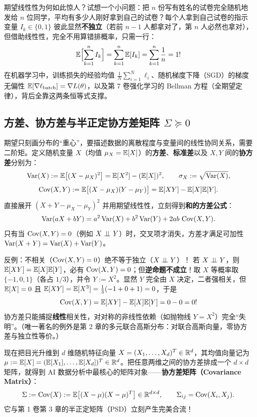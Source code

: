 期望线性性为何如此惊人？试想一个小问题：把 $n$ 份写有姓名的试卷完全随机地发给 $n$ 位同学，平均有多少人刚好拿到自己的试卷？每个人拿到自己试卷的指示变量 $I_k \in \{0, 1\}$ 彼此显然\textbf{不独立}（若前 $n-1$ 人都拿对了，第 $n$ 人必然也拿对），但借助线性性，完全不用算错排概率，只需一行：
\[
  \mathbb{E}\Bigl[\sum_{k=1}^n I_k\Bigr] = \sum_{k=1}^n \mathbb{E}[I_k] = \sum_{k=1}^n \frac{1}{n} = 1!
\]
在机器学习中，训练损失的经验均值 $\frac{1}{N}\sum_{i=1}^N \ell_i$、随机梯度下降（SGD）的梯度无偏性 $\mathbb{E}[\nabla \ell_{\text{batch}}] = \nabla L(\theta)$，以及第 7 卷强化学习的 Bellman 方程（全期望定律），背后全靠这两条恒等式支撑。

\subsection{方差、协方差与半正定协方差矩阵 $\Sigma \succeq 0$}

期望只刻画分布的“重心”，要描述数据的离散程度与变量间的线性协同关系，需要二阶矩。定义随机变量 $X$（均值 $\mu_X = \mathbb{E}[X]$）的\textbf{方差}、\textbf{标准差}以及 $X, Y$ 间的\textbf{协方差}分别为：
\[
  \operatorname{Var}(X) := \mathbb{E}\bigl[(X - \mu_X)^2\bigr] = \mathbb{E}[X^2] - (\mathbb{E}[X])^2, \qquad
  \sigma_X := \sqrt{\operatorname{Var}(X)},
\]
\[
  \operatorname{Cov}(X, Y) := \mathbb{E}\bigl[(X - \mu_X)(Y - \mu_Y)\bigr] = \mathbb{E}[XY] - \mathbb{E}[X]\mathbb{E}[Y].
\]
直接展开 $(X + Y - \mu_X - \mu_Y)^2$ 并用期望线性性，立刻得到\textbf{和的方差公式}：
\begin{equation}
  \operatorname{Var}(aX + bY) = a^2\operatorname{Var}(X) + b^2\operatorname{Var}(Y) + 2ab\,\operatorname{Cov}(X, Y). \label{eq:ch1-var-sum}
\end{equation}
只有当 $\operatorname{Cov}(X, Y) = 0$（例如 $X \perp\!\!\!\perp Y$）时，交叉项才消失，方差才满足可加性 $\operatorname{Var}(X+Y) = \operatorname{Var}(X) + \operatorname{Var}(Y)$。

\begin{failBox}{反例：不相关（$\operatorname{Cov}(X,Y)=0$）绝不等于独立（$X \perp\!\!\!\perp Y$）！}
若 $X \perp\!\!\!\perp Y$，则 $\mathbb{E}[XY] = \mathbb{E}[X]\mathbb{E}[Y]$，必有 $\operatorname{Cov}(X,Y)=0$；但\textbf{逆命题不成立}！取 $X$ 等概率取 $\{-1, 0, 1\}$（各占 $1/3$），并令 $Y := X^2$。显然 $Y$ 完全由 $X$ 决定，二者强相关，但 $\mathbb{E}[X]=0$ 且 $\mathbb{E}[XY] = \mathbb{E}[X^3] = \frac{1}{3}(-1 + 0 + 1) = 0$，于是
\[
  \operatorname{Cov}(X, Y) = \mathbb{E}[XY] - \mathbb{E}[X]\mathbb{E}[Y] = 0 - 0 = 0!
\]
协方差只能捕捉\textbf{线性}相关性，对对称的非线性依赖（如抛物线 $Y=X^2$）完全“失明”。（唯一著名的例外是第 2 章的多元联合高斯分布：对联合高斯向量，零协方差与独立性等价。）
\end{failBox}

现在把目光升维到 $d$ 维随机特征向量 $X = (X_1, \dots, X_d)^T \in \mathbb{R}^d$，其均值向量记为 $\mu := \mathbb{E}[X] = (\mathbb{E}[X_1],\allowbreak \dots,\allowbreak \mathbb{E}[X_d])^T \in \mathbb{R}^d$。把任意两维之间的协方差排成一个 $d\times d$ 矩阵，就得到 AI 数据分析中最核心的矩阵对象——\textbf{协方差矩阵（Covariance Matrix）}：
\begin{equation}
  \Sigma := \operatorname{Cov}(X) := \mathbb{E}\bigl[(X - \mu)(X - \mu)^T\bigr] \in \mathbb{R}^{d\times d}, \qquad \Sigma_{ij} = \operatorname{Cov}(X_i, X_j). \label{eq:ch1-cov-mat}
\end{equation}
它与第 1 卷第 3 章的半正定矩阵（PSD）立刻产生完美合流！

